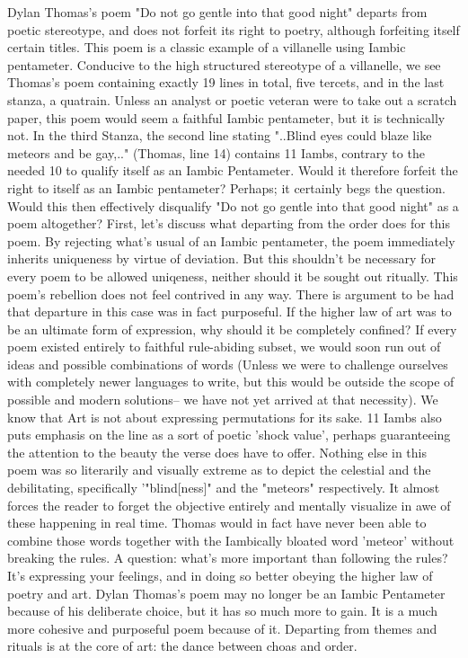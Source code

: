\markdownRendererDocumentBegin
Dylan Thomas's poem "Do not go gentle into that good night" departs from poetic stereotype, and does not forfeit its right to poetry, although forfeiting itself certain titles.\markdownRendererInterblockSeparator
{}This poem is a classic example of a villanelle using Iambic pentameter. Conducive to the high structured stereotype of a villanelle, we see Thomas's poem containing exactly 19 lines in total, five tercets, and in the last stanza, a quatrain. \markdownRendererInterblockSeparator
{}Unless an analyst or poetic veteran were to take out a scratch paper, this poem would seem a faithful Iambic pentameter, but it is technically not. In the third Stanza, the second line stating "..Blind eyes could blaze like meteors and be gay,.." (Thomas, line 14) contains 11 Iambs, contrary to the needed 10 to qualify itself as an Iambic Pentameter. Would it therefore forfeit the right to itself as an Iambic pentameter? Perhaps; it certainly begs the question. Would this then effectively disqualify "Do not go gentle into that good night" as a poem altogether?\markdownRendererInterblockSeparator
{}First, let's discuss what departing from the order does for this poem. By rejecting what's usual of an Iambic pentameter, the poem immediately inherits uniqueness by virtue of deviation. But this shouldn't be necessary for every poem to be allowed uniqeness, neither should it be sought out ritually. This poem's rebellion does not feel contrived in any way.\markdownRendererInterblockSeparator
{}There is argument to be had that departure in this case was in fact purposeful. If the higher law of art was to be an ultimate form of expression, why should it be completely confined? If every poem existed entirely to faithful rule-abiding subset, we would soon run out of ideas and possible combinations of words (Unless we were to challenge ourselves with completely newer languages to write, but this would be outside the scope of possible and modern solutions-- we have not yet arrived at that necessity). We know that Art is not about expressing permutations for its sake.\markdownRendererInterblockSeparator
{}11 Iambs also puts emphasis on the line as a sort of poetic 'shock value', perhaps guaranteeing the attention to the beauty the verse does have to offer. Nothing else in this poem was so literarily and visually extreme as to depict the celestial and the debilitating, specifically '"blind[ness]" and the "meteors" respectively. It almost forces the reader to forget the objective entirely and mentally visualize in awe of these happening in real time.\markdownRendererInterblockSeparator
{}Thomas would in fact have never been able to combine those words together with the Iambically bloated word 'meteor' without breaking the rules. A question: what's more important than following the rules? It's expressing your feelings, and in doing so better obeying the higher law of poetry and art. \markdownRendererInterblockSeparator
{}Dylan Thomas's poem may no longer be an Iambic Pentameter because of his deliberate choice, but it has so much more to gain. It is a much more cohesive and purposeful poem because of it. Departing from themes and rituals is at the core of art: the dance between choas and order.\markdownRendererDocumentEnd